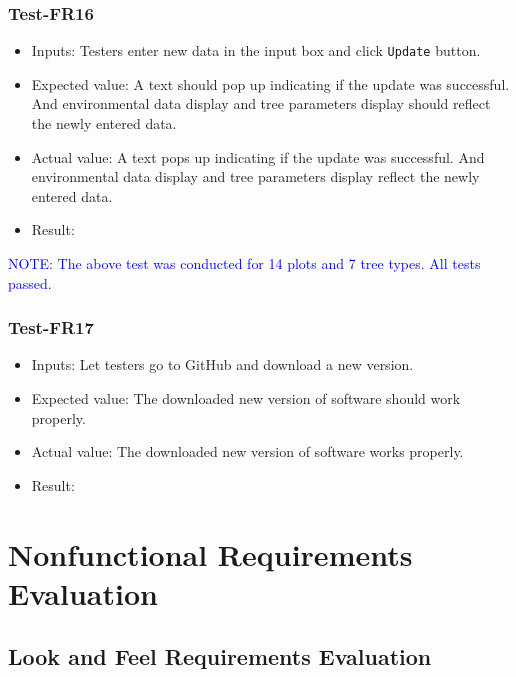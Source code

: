 \documentclass[12pt, titlepage]{article}
\begin{document}
\subsubsection{Test-FR16}
\begin{itemize}
    \item Inputs: Testers enter new data in the input box and click \verb|Update| button.
    \item Expected value: A text should pop up indicating if the update was successful. And environmental data display and tree parameters display should 
    reflect the newly entered data. 
    \item Actual value: A text pops up indicating if the update was successful. And environmental data display and tree parameters display  
    reflect the newly entered data.
    \item Result: \pass
\end{itemize}
\textcolor{blue}{NOTE: The above test was conducted for 14 plots and 7 tree types. 
All tests passed.}

\subsubsection{Test-FR17}
\begin{itemize}
    \item Inputs: Let testers go to GitHub and download a new version. 
    \item Expected value: The downloaded new version of software should work properly.
    \item Actual value: The downloaded new version of software works properly.
    \item Result: \pass
\end{itemize}

\newpage

\section{Nonfunctional Requirements Evaluation}

\subsection{Look and Feel Requirements Evaluation}
\end{document}
